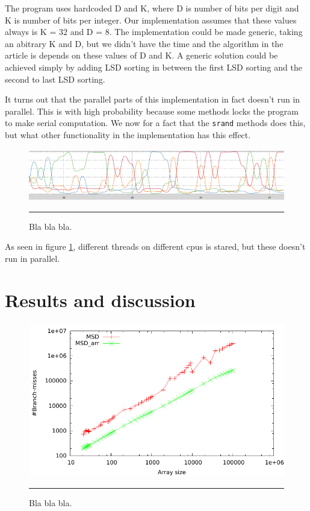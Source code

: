The program uses hardcoded D and K, where D is number of bits per digit and K is number of bits per integer. Our implementation assumes that these values always is K = 32 and D = 8.
The implementation could be made generic, taking an abitrary K and D, but we didn't have the time and the algorithm in the article is depends on these values of D and K.
A generic solution could be achieved simply by adding LSD sorting in between the first LSD sorting and the second to last LSD sorting.

It turns out that the parallel parts of this implementation in fact doesn't run in parallel. This is with high probability because some methods locks the program to make serial computation.
We now for a fact that the \verb!srand! methods does this, but what other functionality in the implementation has this effect.   

\begin{figure}[htbp]
	\centering
		\includegraphics[width=\textwidth]{./Figures/Project2b/multicore_cpu_usage.png}
		\rule{35em}{0.5pt}
	\caption[Multicore CPU usage]{
	Bla bla bla.
	}
	\label{fig:multicore_cpu_usage}
\end{figure}

As seen in figure \ref{fig:multicore_cpu_usage}, different threads on different cpus is stared, but these doesn't run in parallel.

\section{Results and discussion}


\begin{figure}[htbp]
	\centering
		\includegraphics[width=\textwidth]{./Figures/Project2b/Branch_misses.pdf}
		\rule{35em}{0.5pt}
	\caption[Branch misses]{
	Bla bla bla.
	}
	\label{fig:Branch_misses_p2b}
\end{figure}


